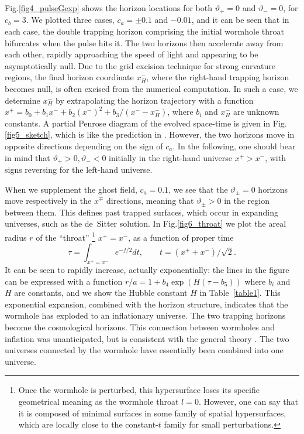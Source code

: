 \documentclass[aps,showpacs,twocolumn,draft,eqsecnum]{revtex4}
\begin{document}
Fig.\ref{fig4_pulseGexp} shows the horizon locations for both $\vartheta_+=0$
and $\vartheta_-=0$, for $c_b=3$. We plotted three cases, $c_a = \pm 0.1$ and
$-0.01$, and it can be seen that in each case, the double trapping horizon
comprising the initial wormhole throat bifurcates when the pulse hits it. The
two horizons then accelerate away from each other, rapidly approaching the
speed of light and appearing to be asymptotically null. Due to the grid
excision technique for strong curvature regions, the final horizon coordinate
$x_H^-$, where the right-hand trapping horizon becomes null, is often excised
from the numerical computation.  In such a case, we determine $x_H^-$ by
extrapolating the horizon trajectory with a function $x^+=b_0+b_1 x^-+b_2
(x^-)^2+b_3/(x^- - x_H^-)$, where $b_i$ and  $x_H^-$ are unknown constants. A
partial Penrose diagram of the evolved space-time is given in
Fig.\ref{fig5_sketch}, which is like the prediction in \cite{wh}. However, the
two horizons move in opposite directions depending on the sign of $c_a$. In the
following, one should bear in mind that $\vartheta_+>0,\vartheta_-<0$ initially
in the right-hand universe $x^+>x^-$, with signs reversing for the left-hand
universe.

When we supplement the ghost field, $c_a = 0.1$, we see that the
$\vartheta_\pm=0$ horizons move respectively in the $x^\mp$ directions, meaning
that $\vartheta_\pm>0$ in the region between them. This defines past trapped
surfaces, which occur in expanding universes, such as the de~Sitter solution.
In Fig.\ref{fig6_throat} we plot the areal radius $r$ of the ``throat''
\footnote{Once the wormhole is perturbed, this hypersurface loses its specific
geometrical meaning as the wormhole throat $l=0$. However, one can say that it
is composed of minimal surfaces in some family of spatial hypersurfaces, which
are locally close to the constant-$t$ family for small perturbations.}
$x^+=x^-$, as a function of proper time
\begin{equation}
\tau = \int_{x^+=x^-} e^{-f/2}dt,\qquad t=(x^+ + x^-)/\sqrt{2}.
\end{equation}
It can be seen to rapidly increase, actually exponentially: the lines in the
figure can be expressed with a function $r/a=1+b_4 \exp(H (\tau -b_5))$ where
$b_i$ and $H$ are constants, and we show the Hubble constant $H$ in
Table~\ref{table1}. This exponential expansion, combined with the horizon
structure, indicates that the wormhole has exploded to an inflationary
universe. The two trapping horizons become the cosmological horizons. This
connection between wormholes and inflation was unanticipated, but is consistent
with the general theory \cite{wh}. The two universes connected by the wormhole
have essentially been combined into one universe.
\end{document}
